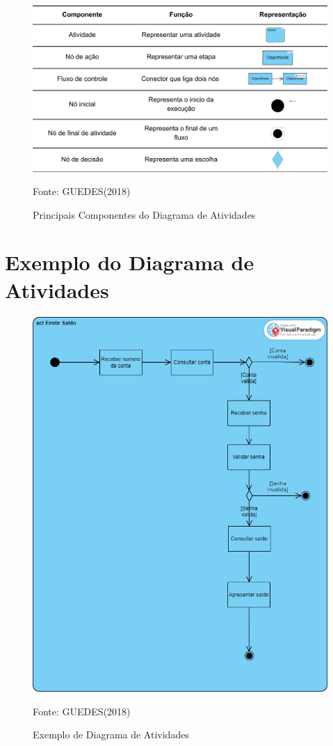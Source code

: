 \documentclass[12pt,openright,oneside,a4paper,
	chapter=TITLE,
	section=TITLE,
	english,brazil]{abntex2}
\begin{document}
\begin{figure}[!htp]
	\caption{Principais Componentes do Diagrama de Atividades}
	\centering
	\includegraphics[scale=0.2]{img/PrincipaisCompAtividades.png}
	\\

	\footnotesize\raggedright Fonte: GUEDES(2018)
\end{figure}

\section{Exemplo do Diagrama de Atividades}

\begin{figure}[!htp]
	\caption{Exemplo de Diagrama de Atividades}
	\centering
	\includegraphics[scale=0.2]{img/ExemploDiagramaAtividades.png}
	\\
	\label{ExemploDiagramaAtividades}
	\footnotesize\raggedright Fonte: GUEDES(2018)
\end{figure}
\end{document}
